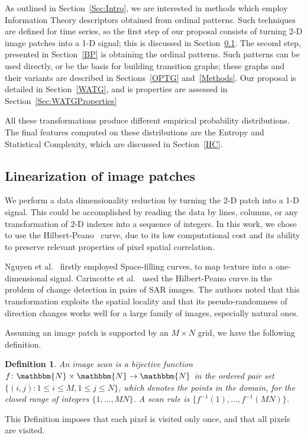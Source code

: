 \documentclass[journal]{IEEEtran}
\begin{document}
As outlined in Section~\ref{Sec:Intro}, we are interested in methods which employ Information Theory descriptors obtained from ordinal patterns.
Such techniques are defined for time series, so the first step of our proposal consists of turning \mbox{2-D} image patches into a \mbox{1-D} signal; this is discussed in Section~\ref{linearization}.
The second step, presented in Section~\ref{BP} is obtaining the ordinal patterns.
Such patterns can be used directly, or be the basis for building transition graphs; these graphs and their variants are described in Sections~\ref{OPTG} and~\ref{Methods}.
Our proposal is detailed in Section~\ref{WATG}, and is properties are assessed in Section~\ref{Sec:WATGProperties}

All these transformations produce different empirical probability distributions.
The final features computed on these distributions are the Entropy and Statistical Complexity, which are discussed in Section~\ref{HC}.


\subsection{Linearization of image patches}\label{linearization}

We perform a data dimensionality reduction by turning the \mbox{2-D} patch into a \mbox{1-D} signal.
This could be accomplished by reading the data by lines, columns, or any transformation of \mbox{2-D} indexes into a sequence of integers.
In this work, we chose to use the Hilbert-Peano~\cite{Lee1994Texture} curve, due to its low computational cost and its ability to preserve relevant properties of pixel spatial correlation.

Nguyen et al.~\cite{nguyen1982space} firstly employed Space-filling curves, to map texture into a one-dimensional signal.
Carincotte et al.~\cite{Carincotte2006changeDetection} used the Hilbert-Peano curve in the problem of change detection in pairs of SAR images.
The authors noted that this transformation exploits the spatial locality and that its pseudo-randomness
of direction changes works well for a large family of images, especially
natural ones.

Assuming an image patch is supported by an $M \times N$ grid, we have the following definition.

\newtheorem{mydef}{Definition}
\begin{mydef}
	An image scan is a bijective function $f \colon \mathbbm{N} \times \mathbbm{N} \to \mathbbm{N}$ in the ordered pair set $ \{(i, j): 1 \leq i \leq M , 1 \leq j \leq N\}$, which denotes the points in the domain, for the closed range of integers $\{1, \dots, M  N\}$.
	A scan rule is $\{f^{-1}(1), \dots, f^{-1}(M  N)\}$.
	\label{def:CurveFilling}
\end{mydef}
This Definition imposes that each pixel is visited only once, and that all pixels are visited.
\end{document}
